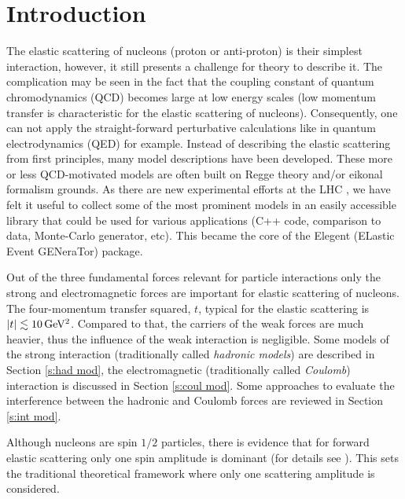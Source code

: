 \documentclass[preprint,12pt]{elsarticle}
\def\un#1{{\,\rm #1}}
\begin{document}
\newpage


\section{Introduction}\label{s:inc}

The elastic scattering of nucleons (proton or anti-proton) is their simplest interaction, however, it still presents a challenge for theory to describe it. The complication may be seen in the fact that the coupling constant of quantum chromodynamics (QCD) becomes large at low energy scales (low momentum transfer is characteristic for the elastic scattering of nucleons). Consequently, one can not apply the straight-forward perturbative calculations like in quantum electrodynamics (QED) for example. Instead of describing the elastic scattering from first principles, many model descriptions have been developed. These more or less QCD-motivated models are often built on Regge theory and/or eikonal formalism grounds. As there are new experimental efforts at the LHC \cite{totem,alfa}, we have felt it useful to collect some of the most prominent models in an easily accessible library that could be used for various applications (C++ code, comparison to data, Monte-Carlo generator, etc). This became the core of the Elegent (ELastic Event GENeraTor) package.

Out of the three fundamental forces relevant for particle interactions only the strong and electromagnetic forces are important for elastic scattering of nucleons. The four-momentum transfer squared, $t$, typical for the elastic scattering is $|t| \lesssim 10\un{GeV^2}$. Compared to that, the carriers of the weak forces are much heavier, thus the influence of the weak interaction is negligible. Some models of the strong interaction (traditionally called {\em hadronic models}) are described in Section \ref{s:had mod}, the electromagnetic (traditionally called {\em Coulomb}) interaction is discussed in Section \ref{s:coul mod}. Some approaches to evaluate the interference between the hadronic and Coulomb forces are reviewed in Section \ref{s:int mod}.

Although nucleons are spin $1/2$ particles, there is evidence that for forward elastic scattering only one spin amplitude is dominant (for details see \cite[section 1]{jan_thesis}). This sets the traditional theoretical framework where only one scattering amplitude is considered.
\end{document}

